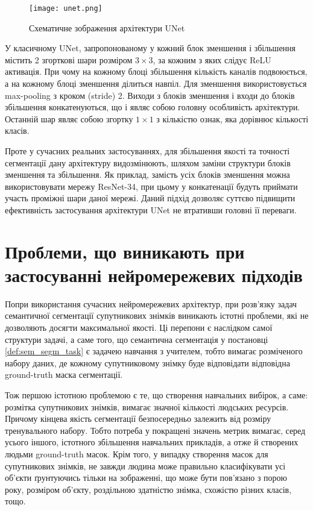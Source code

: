 \begin{figure}[!ht]
    \centering
    \texttt{[image: unet.png]}
    \caption{Схематичне зображення \cite{unet} архітектури  UNet}
    \label{fig:unet}
\end{figure}

У класичному UNet, запропонованому у \cite{unet} кожний блок зменшення і збільшення містить 2 згорткові шари розміром $3 \times 3$, за кожним
з яких слідує ReLU активація. При чому на кожному блоці збільшення
кількість каналів подвоюється, а на кожному блоці зменшення ділиться навпіл.
Для зменшення використовується max-pooling з
кроком (stride) 2. Виходи з блоків зменшення і входи до блоків
збільшення конкатенуються, що і являє собою головну особливість архітектури.
Останній шар являє собою згортку $1 \times 1$ з кількістю ознак, яка дорівнює
кількості класів.

Проте у сучасних реальних застосуваннях, для збільшення
якості та точності сегментації дану архітектуру видозмінюють, шляхом
заміни структури блоків зменшення та збільшення. Як приклад, замість
усіх блоків зменшення можна використовувати мережу ResNet-34, при цьому
у конкатенації будуть приймати участь проміжні шари даної мережі.
Даний підхід дозволяє суттєво підвищити ефективність застосування
архітектури UNet не втративши головні її переваги.

\section{Проблеми, що виникають при застосуванні нейромережевих підходів}

Попри використання сучасних нейромережевих
архітектур, при розв'язку задач
семантичної сегментації супутникових знімків
виникають істотні проблеми, які не дозволяють
досягти максимальної якості. Ці перепони
є наслідком самої структури задачі, а саме того, що
семантична сегментація у постановці \ref{def:sem_segm_task}
є задачею навчання з учителем, тобто вимагає розміченого
набору даних, де кожному супутниковому знімку буде
відповідати відповідна ground-truth маска сегментації.

Тож першою істотною проблемою є те, що створення
навчальних вибірок, а саме: розмітка супутникових знімків,
вимагає значної кількості людських ресурсів. Причому кінцева
якість сегментації безпосередньо залежить від
розміру тренувального набору. Тобто потреба у
покращені значень метрик вимагає, серед усього іншого,
істотного збільшення навчальних прикладів,
а отже й створених людьми ground-truth масок.
Крім того, у випадку створення масок для супутникових знімків,
не завжди людина може правильно класифікувати усі об'єкти ґрунтуючись
тільки на зображенні, що може бути пов'язано з порою року,
розміром об'єкту, роздільною здатністю знімка, схожістю різних класів, тощо.

